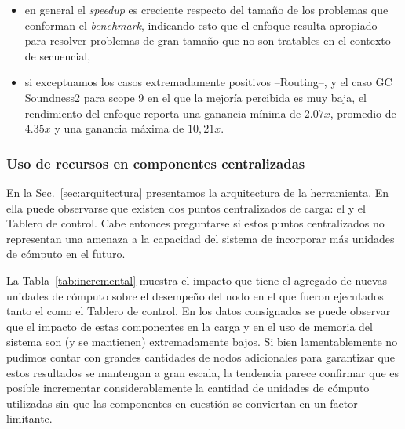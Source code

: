 \begin{itemize}
\item en general el \emph{speedup} es creciente respecto del tamaño de los problemas que conforman el \emph{benchmark}, indicando esto que el enfoque resulta apropiado para resolver problemas de gran tamaño que no son tratables en el contexto de \ssolving secuencial,
\item si exceptuamos los casos extremadamente positivos --Routing--, y el caso GC Soundness2 para scope 9 en el que la mejoría percibida es muy baja, el rendimiento del enfoque reporta una ganancia mínima de $2.07x$, promedio de $4.35x$ y una ganancia máxima de $10,21x$.
\end{itemize}

\subsubsection{Uso de recursos en componentes centralizadas}

En la Sec.~\ref{sec:arquitectura} presentamos la arquitectura de la
herramienta. En ella puede observarse que existen dos puntos centralizados de
carga: el \master y el Tablero de control. Cabe entonces preguntarse si
estos puntos centralizados no representan una amenaza a la capacidad del
sistema de incorporar más unidades de cómputo en el futuro.

La Tabla~\ref{tab:incremental} muestra el impacto que tiene el agregado de
nuevas unidades de cómputo sobre el desempeño del nodo en el que fueron
ejecutados tanto el \master como el Tablero de control. En los datos consignados se
puede observar que el impacto de estas componentes en la carga y en el uso de
memoria del sistema son (y se mantienen) extremadamente bajos. Si bien lamentablemente
no pudimos contar con grandes cantidades de nodos adicionales para garantizar
que estos resultados se mantengan a gran escala, la tendencia parece confirmar
que es posible incrementar considerablemente la cantidad de unidades de cómputo
utilizadas sin que las componentes en cuestión se conviertan en un factor limitante.


